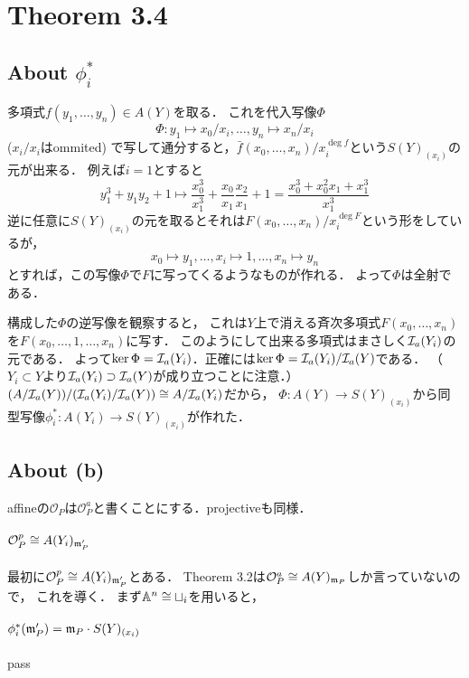 \documentclass[a4paper]{jarticle}
\begin{document}
\section{Theorem 3.4}
    \subsection{About $\phi^{\ast}_i$}
        多項式$f(y_1, \dots, y_n) \in A(Y)$を取る．
        これを代入写像$\Phi$
        \[ \Phi: y_1 \mapsto x_0/x_i, \dots, y_n \mapsto x_n/x_i \]($x_i/x_i$はommited)
        で写して通分すると，$\bar{f}(x_0,\dots,x_n)/x_i^{\deg f}$という$S(Y)_{(x_i)}$の元が出来る．
        例えば$i=1$とすると
        \[ y_1^3+y_1 y_2+1 \mapsto \frac{x_0^3}{x_1^3}+\frac{x_0}{x_1}\frac{x_2}{x_1}+1=\frac{x_0^3+x_0^2 x_1+x_1^3}{x_1^3} \]
        逆に任意に$S(Y)_{(x_i)}$の元を取るとそれは$F(x_0,\dots,x_n)/x_i^{\deg F}$という形をしているが，
        \[ x_0 \mapsto y_1, \dots, x_i \mapsto 1, \dots, x_n \mapsto y_n \]
        とすれば，この写像$\Phi$で$F$に写ってくるようなものが作れる．
        よって$\Phi$は全射である．

        構成した$\Phi$の逆写像を観察すると，
        これは$Y$上で消える斉次多項式$F(x_0,\dots,x_n)$を$F(x_0,\dots,1,\dots,x_n)$に写す．
        このようにして出来る多項式はまさしく$\mathcal{I}_a(Y_i)$の元である．
        よって$\ker \Phi=\mathcal{I}_a(Y_i)$．正確には$\ker \Phi=\mathcal{I}_a(Y_i)/\mathcal{I}_a(Y)$である．
        （$Y_i \subset Y$より$\mathcal{I}_a(Y_i) \supset \mathcal{I}_a(Y)$が成り立つことに注意．）
        $(A/\mathcal{I}_a(Y))/(\mathcal{I}_a(Y_i)/\mathcal{I}_a(Y)) \cong A/\mathcal{I}_a(Y_i)$だから，
        $\Phi: A(Y) \to S(Y)_{(x_i)}$から同型写像$\phi^{\ast}_i: A(Y_i) \to S(Y)_{(x_i)}$が作れた．

    \subsection{About (b)}
    affineの$\mathcal{O}_P$は$\mathcal{O}_P^a$と書くことにする．projectiveも同様．

    \paragraph{$\mathcal{O}_P^p \cong A(Y_i)_{\mathfrak{m}'_P}$}
    最初に$\mathcal{O}_P^p \cong A(Y_i)_{\mathfrak{m}'_P}$とある．
    Theorem 3.2は$\mathcal{O}_P^a \cong A(Y)_{\mathfrak{m}_P}$しか言っていないので，
    これを導く．
    まず$\mathbb{A}^n \cong \sqcup_i$を用いると，
    
    \paragraph{$\phi^{\ast}_i(\mathfrak{m}'_P)=\mathfrak{m}_P \cdot S(Y)_{(x_i)}$}
    pass
\end{document}
